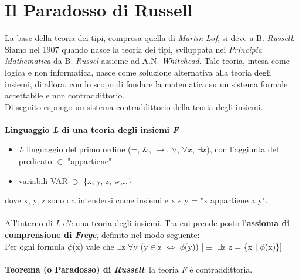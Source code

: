 \section{Il Paradosso di Russell}
\label{sec:paradosso-di-russell}
La base della teoria dei tipi, compresa quella di \textit{Martin-L$\ddot{o}$f}, si deve a B. \textit{Russell}. \\
Siamo nel 1907 quando nasce la teoria dei tipi, sviluppata nei \textit{Principia Mathematica} da B. \textit{Russel} assieme ad A.N. \textit{Whitehead}. Tale teoria, intesa come logica e non informatica, nasce come soluzione alternativa alla teoria degli insiemi, di allora, con lo scopo di fondare la matematica su un sistema formale accettabile e non contraddittorio.\\
Di seguito espongo un sistema contraddittorio della teoria degli insiemi.\\
\\
\textbf{Linguaggio \textit{L} di una teoria degli insiemi \textit{F}}\mbox{}
\begin{itemize}
\item \textit{L} linguaggio del primo ordine (=, \&, $\rightarrow$, $\lor$, $\forall{x}$, $\exists{x}$), con l'aggiunta del predicato $\in$ "appartiene"
\item variabili VAR $\ni$ \{x, y, z, w,\dots \}
\end{itemize}
\noindent
dove x, y, z sono da intendersi come insiemi e x $\epsilon$ y = "x appartiene a y".\\\\
All'interno di \textit{L} c'\`e una teoria degli insiemi. Tra cui prende posto l'\textbf{assioma di comprensione di \textit{Frege}}, definito nel modo seguente:\\
Per ogni formula $\phi$(x) vale che $\exists$z $\forall$y (y$\in$z $\Leftrightarrow$ $\phi$(y)) [$\equiv$ $\exists$z z = \{x $\big|$ $\phi$(x)\}]\\\\
\textbf{Teorema (o Paradosso) di \textit{Russell}}: la teoria \textit{F} \`e contraddittoria.\\

